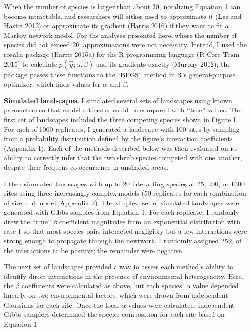 \documentclass[12pt,]{article}
\begin{document}
\begin{spacing}{1.9}
\begin{flushleft}
When the number of species is larger than about 30, noralizing Equation
1 can become intractable, and researchers will either need to
approximate it (Lee and Hastie 2012) or approximate its gradient (Harris
2016) if they want to fit a Markov network model. For the analyses
presented here, where the number of species did not exceed 20,
approximations were not necessary. Instead, I used the rosalia package
(Harris 2015a) for the R programming language (R Core Team 2015) to
calculate \(p(\vec{y}; \alpha, \beta)\) and its gradients exactly
(Murphy 2012); the package passes these functions to the ``BFGS'' method
in R's general-purpose optimizer, which finds values for \(\alpha\) and
\(\beta\).

\noindent \textbf{Simulated landscapes.} I simulated several sets of
landscapes using known parameters so that model estimates could be
compared with ``true'' values. The first set of landscapes included the
three competing species shown in Figure 1. For each of 1000 replicates,
I generated a landscape with 100 sites by sampling from a probability
distribution defined by the figure's interaction coefficients (Appendix
1). Each of the methods described below was then evaluated on its
ability to correctly infer that the two shrub species competed with one
another, despite their frequent co-occurrence in unshaded areas.

I then simulated landscapes with up to 20 interacting species at 25,
200, or 1600 sites using three increasingly complex models (50
replicates for each combination of size and model; Appendix 2). The
simplest set of simulated landscapes were generated with Gibbs samples
from Equation 1. For each replicate, I randomly drew the ``true''
\(\beta\) coefficient magnitudes from an exponential distribution with
rate 1 so that most species pairs interacted negligibly but a few
interactions were strong enough to propagate through the newtwork. I
randomly assigned 25\% of the interactions to be positive; the remainder
were negative.

The next set of landscapes provided a way to assess each method's
ability to identify direct interactions in the presence of environmental
heterogeneity. Here, the \(\beta\) coefficients were calculated as
above, but each species' \(\alpha\) value depended linearly on two
environmental factors, which were drawn from independent Gaussians for
each site. Once the local \(\alpha\) values were calculated, independent
Gibbs samplers determined the species composition for each site based on
Equation 1.


\end{flushleft}
\end{spacing}
\end{document}
